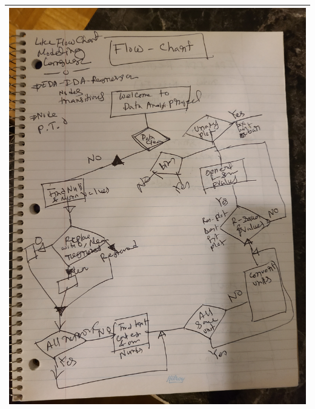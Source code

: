 \begin{tabular}{|c|}
\hline
\includegraphics[scale=0.1, angle = -90]{sketch/7.jpg} \\ 
\hline

\end{tabular}
